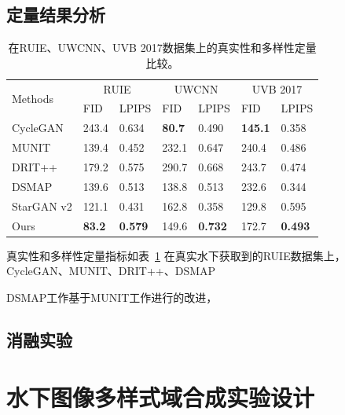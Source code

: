\subsection{定量结果分析}

\begin{table}[ht]
\centering
\caption{在RUIE、UWCNN、UVB 2017数据集上的真实性和多样性定量比较。}
\begin{tabular}{|p{2.5cm}|p{1.7cm}|p{1.7cm}|p{1.7cm}|p{1.7cm}|p{1.7cm}|p{1.7cm}|}
\hline
\multirow{2}{*}{Methods} & \multicolumn{2}{c|}{RUIE} & \multicolumn{2}{c|}{UWCNN} & \multicolumn{2}{c|}{UVB 2017} \\ \cline{2-7} 
                         & FID           & LPIPS       & FID           & LPIPS          & FID            & LPIPS          \\ \hline \hline
CycleGAN                 & 243.4         & 0.634       & \textbf{80.7} & 0.490          & \textbf{145.1} & 0.358          \\ \hline
MUNIT                    & 139.4         & 0.452       & 232.1         & 0.647          & 240.4          & 0.486          \\ \hline
DRIT++                   & 179.2         & 0.575       & 290.7         & 0.668          & 243.7          & 0.474          \\ \hline
DSMAP                    & 139.6         & 0.513       & 138.8         & 0.513          & 232.6          & 0.344          \\ \hline
StarGAN v2               & 121.1         & 0.431       & 162.8         & 0.358          & 129.8          & 0.595          \\ \hline
Ours                     & \textbf{83.2} & \textbf{0.579} & 149.6      & \textbf{0.732} & 172.7          & \textbf{0.493} \\ \hline
\end{tabular}
\label{tab:modal_compare}
\end{table}

真实性和多样性定量指标如表~\ref{tab:modal_compare}
在真实水下获取到的RUIE数据集上，CycleGAN、MUNIT、DRIT++、DSMAP

DSMAP工作基于MUNIT工作进行的改进，

\subsection{消融实验}

\section{水下图像多样式域合成实验设计}
